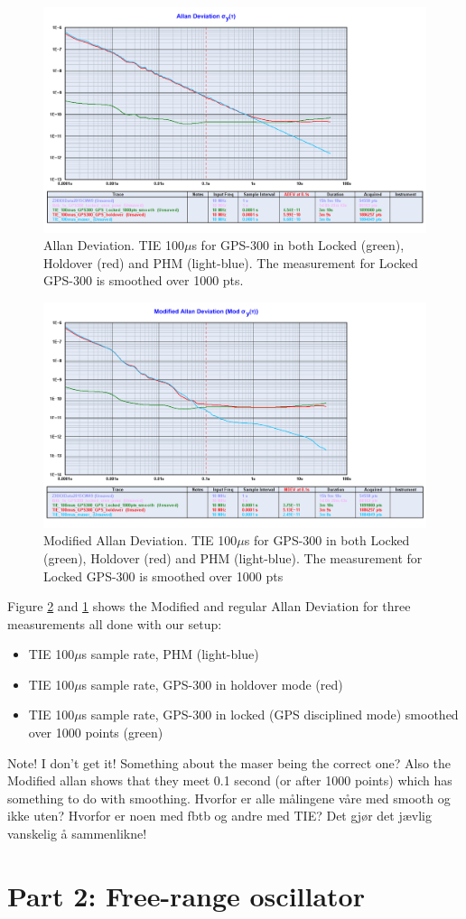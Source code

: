 \documentclass[11pt,english,a4paper]{article}
\begin{document}
\begin{figure}[!htb]
  \centering
    \includegraphics[width=1\textwidth]{del_1_spm6_allan.png}
      \caption{Allan Deviation. TIE 100$\mu$s for GPS-300 in both Locked (green), Holdover (red) and PHM (light-blue). The measurement for Locked GPS-300 is smoothed over 1000 pts.}
          \label{fig:del_1_spm6_allan}
\end{figure}

\begin{figure}[!htb]
  \centering
    \includegraphics[width=1\textwidth]{del_1_spm6_mod_allan.png}
      \caption{Modified Allan Deviation. TIE 100$\mu$s for GPS-300 in both Locked (green), Holdover (red) and PHM (light-blue). The measurement for Locked GPS-300 is smoothed over 1000 pts}
          \label{fig:del_1_spm6_mod_allan}
\end{figure}
Figure \ref{fig:del_1_spm6_mod_allan} and \ref{fig:del_1_spm6_allan} shows the Modified and regular Allan Deviation for three measurements all done with our setup:
\begin{itemize}
  \item TIE 100$\mu$s sample rate, PHM (light-blue)
  \item TIE 100$\mu$s sample rate, GPS-300 in holdover mode (red)
  \item TIE 100$\mu$s sample rate, GPS-300 in locked (GPS disciplined mode) smoothed over 1000 points (green)
\end{itemize}
Note! I don't get it! Something about the maser being the correct one? Also the Modified allan shows that they meet 0.1 second (or after 1000 points) which has something to do with smoothing. Hvorfor er alle målingene våre med smooth og ikke uten? Hvorfor er noen med fbtb og andre med TIE? Det gjør det jævlig vanskelig å sammenlikne!

\section{Part 2: Free-range oscillator}
\end{document}

